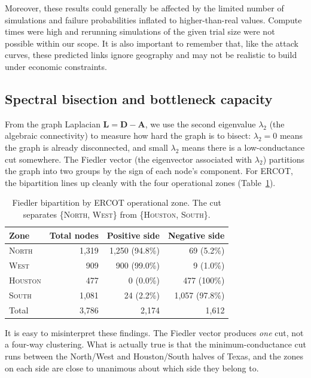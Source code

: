 \documentclass[12pt,letterpaper]{article}
\begin{document}
Moreover, these results could generally be affected by the limited number of simulations and failure probabilities inflated to higher-than-real values. Compute times were high and rerunning simulations of the given trial size were not possible within our scope. It is also important to remember that, like the attack curves, these predicted links ignore geography and may not be realistic to build under economic constraints.

\subsection{Spectral bisection and bottleneck capacity}
\label{sec:spectral}

From the graph Laplacian $\mathbf{L} = \mathbf{D} - \mathbf{A}$, we use the second eigenvalue $\lambda_2$ (the algebraic connectivity) to measure how hard the graph is to bisect: $\lambda_2 = 0$ means the graph is already disconnected, and small $\lambda_2$ means there is a low-conductance cut somewhere. The Fiedler vector (the eigenvector associated with $\lambda_2$) partitions the graph into two groups by the sign of each node's component. For ERCOT, the bipartition lines up cleanly with the four operational zones (Table~\ref{tab:fiedler}).

\begin{table}[h]
\centering
\caption{Fiedler bipartition by ERCOT operational zone. The cut separates \{\textsc{North}, \textsc{West}\} from \{\textsc{Houston}, \textsc{South}\}.}
\label{tab:fiedler}
\begin{tabular}{@{}lrrr@{}}
\toprule
\textbf{Zone} & \textbf{Total nodes} & \textbf{Positive side} & \textbf{Negative side} \\
\midrule
\textsc{North}   & 1{,}319 & 1{,}250 (94.8\%) & 69   (5.2\%) \\
\textsc{West}    & 909     & 900   (99.0\%)   & 9    (1.0\%) \\
\textsc{Houston} & 477     & 0     (0.0\%)    & 477  (100\%) \\
\textsc{South}   & 1{,}081 & 24    (2.2\%)    & 1{,}057 (97.8\%) \\
\midrule
Total & 3{,}786 & 2{,}174 & 1{,}612 \\
\bottomrule
\end{tabular}
\end{table}

It is easy to misinterpret these findings. The Fiedler vector produces \emph{one} cut, not a four-way clustering. What is actually true is that the minimum-conductance cut runs between the North/West and Houston/South halves of Texas, and the zones on each side are close to unanimous about which side they belong to.
\end{document}
